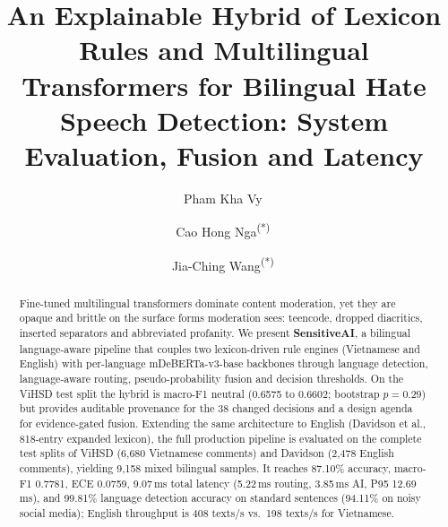 \documentclass[runningheads]{llncs}
\begin{document}
\linespread{0.90}\selectfont

\title{An Explainable Hybrid of Lexicon Rules and Multilingual Transformers for
       Bilingual Hate Speech Detection: System Evaluation, Fusion and Latency}
\author{
  Pham Kha Vy\, \and
  Cao Hong Nga\textsuperscript{(*)}\, \and
  Jia-Ching Wang\textsuperscript{(*)}\,
}
\maketitle

\begin{abstract}
Fine-tuned multilingual transformers dominate content moderation, yet they are
opaque and brittle on the surface forms moderation sees: teencode, dropped
diacritics, inserted separators and abbreviated profanity.  We present
\textbf{SensitiveAI}, a bilingual language-aware pipeline that couples two
lexicon-driven rule engines (Vietnamese and English) with per-language
mDeBERTa-v3-base backbones through language detection, language-aware routing,
pseudo-probability fusion and decision thresholds.  On the ViHSD test split the
hybrid is macro-F1 neutral (0.6575 to 0.6602; bootstrap $p=0.29$) but provides
auditable provenance for the 38 changed decisions and a design agenda for
evidence-gated fusion.  Extending the same architecture to English (Davidson et
al., 818-entry expanded lexicon), the full production pipeline is evaluated on
the complete test splits of ViHSD (6{,}680 Vietnamese comments) and Davidson
(2{,}478 English comments), yielding 9{,}158 mixed bilingual samples.  It reaches
87.10\% accuracy, macro-F1 0.7781, ECE 0.0759, 9.07\,ms total latency (5.22\,ms
routing, 3.85\,ms AI, P95 12.69\,ms), and 99.81\% language detection accuracy on
standard sentences (94.11\% on noisy social media); English throughput is 408
texts/s vs.\ 198 texts/s for Vietnamese.
\end{abstract}
\end{document}

